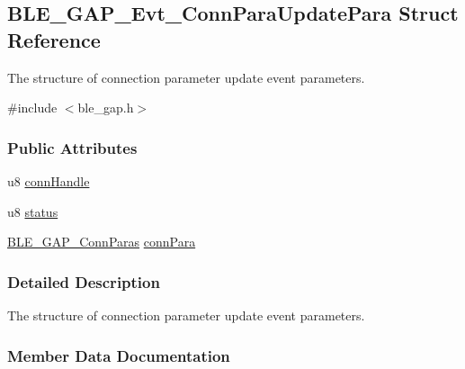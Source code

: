 \hypertarget{struct_b_l_e___g_a_p___evt___conn_para_update_para}{}\subsection{B\+L\+E\+\_\+\+G\+A\+P\+\_\+\+Evt\+\_\+\+Conn\+Para\+Update\+Para Struct Reference}
\label{struct_b_l_e___g_a_p___evt___conn_para_update_para}


The structure of connection parameter update event parameters.  




{\ttfamily \#include $<$ble\+\_\+gap.\+h$>$}

\subsubsection*{Public Attributes}
\begin{DoxyCompactItemize}
\item 
u8 \hyperlink{struct_b_l_e___g_a_p___evt___conn_para_update_para_ad3469de7c01d25816e74d777604df53b}{conn\+Handle}
\item 
u8 \hyperlink{struct_b_l_e___g_a_p___evt___conn_para_update_para_a369624cc4dad2e7c5a433633fe688f32}{status}
\item 
\hyperlink{struct_b_l_e___g_a_p___conn_paras}{B\+L\+E\+\_\+\+G\+A\+P\+\_\+\+Conn\+Paras} \hyperlink{struct_b_l_e___g_a_p___evt___conn_para_update_para_ab5461df706020b9bdfeadb0080a0c99d}{conn\+Para}
\end{DoxyCompactItemize}


\subsubsection{Detailed Description}
The structure of connection parameter update event parameters. 

\subsubsection{Member Data Documentation}
